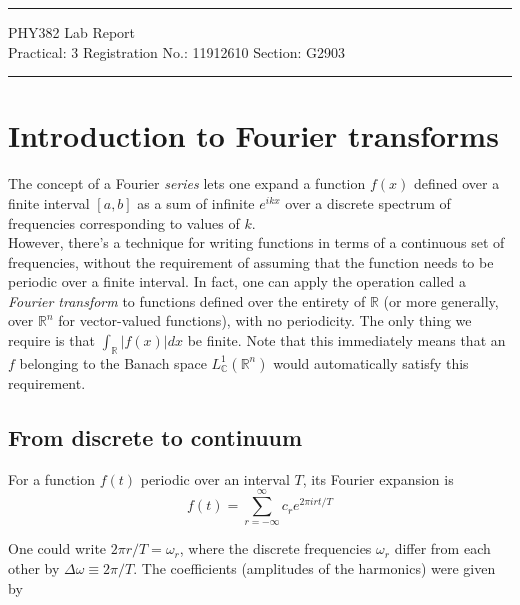 \documentclass{article}
\begin{document}
	
	\author{Aayush Arya}
	\date{(Submitted: September 14, 2021)}
	\title{}
	
	\maketitle
	
	\hrule
	\begin{center}
		PHY382 Lab Report\\
		Practical: 3 \quad Registration No.: 11912610 \quad Section: G2903
	\end{center}
	\hrule
	
	\section*{Introduction to Fourier transforms}
	The concept of a Fourier {\it series} lets one expand a function $f(x)$ defined over a finite interval $[a,b]$ as a sum of infinite $e^{ikx}$ over a discrete spectrum of frequencies corresponding to values of $k$.\\
	
	 However, there's a technique for writing functions in terms of a continuous set of frequencies, without the requirement of assuming that the function needs to be periodic over a finite interval. In fact, one can apply the operation \textemdash called a {\it Fourier transform} \textemdash to functions defined over the entirety of $\mathbb{R}$ (or more generally, over $\mathbb{R}^n$ for vector-valued functions), with no periodicity. The only thing we require is that $\int_\mathbb{R} |f(x)|dx$ be finite. Note that this immediately means that an $f$ belonging to the Banach space $L^1_\mathbb{C}(\mathbb{R}^n)$ would automatically satisfy this requirement.
	
	\subsection*{From discrete to continuum}
	
	For a function $f(t)$ periodic over an interval $T$, its Fourier expansion is \begin{equation}
		f(t) = \sum_{r=-\infty}^{\infty}c_r e^{2\pi i rt/T}
	\end{equation}
	
	One could write $2\pi r/T = \omega_r$, where the discrete frequencies $\omega_r$ differ from each other by $\Delta\omega \equiv 2\pi/T$. The coefficients (amplitudes of the harmonics) were given by
	
\end{document}
